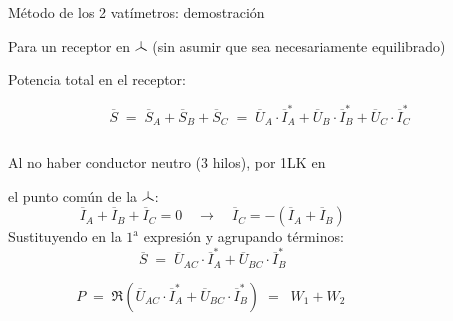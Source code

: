 \documentclass[aspectratio=169, usenames,svgnames,dvipsnames]{beamer}
\newcommand\wye{\scalerel*{\stackengine{-1pt}{%
  \rotatebox[origin=c]{30}{\rule{10pt}{.9pt}}\kern-1pt%
  \rotatebox[origin=c]{-30}{\rule{10pt}{1.3pt}}}{%
  \rule{.9pt}{10pt}}{O}{c}{F}{F}{S}}{\Delta}} %
\begin{document}
\begin{frame}{Método de los 2 vatímetros: \hspace{3mm}demostración}

    \vspace{2mm}
    Para un \alert{receptor} en $\wye$    
    \hspace{3mm}(sin asumir que sea necesariamente equilibrado)

    \vspace{2mm}
    \alert{Potencia total} en el receptor: 

    \vspace{-4mm}
    \begin{equation*}
	    \overline{S}
        \; = \; 
        \overline{S}_A + \overline{S}_B + \overline{S}_C
        \; = \; 
        \overline{U}_A \cdot \overline{I}_A^* + \overline{U}_B \cdot \overline{I}_B^* + \overline{U}_C \cdot \overline{I}_C^*
	\end{equation*}
 
	\begin{columns}
	\begin{column}{0.6\linewidth}
    
        Al no haber conductor neutro (\alert{3 hilos}), por \alert{1LK} en 
        
        el punto común de la $\wye$:
    	\begin{equation*}
    	    \overline{I}_A + \overline{I}_B + \overline{I}_C = 0 
            \quad \rightarrow \quad 
            \overline{I}_C = -(\overline{I}_A+\overline{I}_B)
    	\end{equation*}
    	Sustituyendo en la $1^{\textrm{a}}$ expresión y agrupando términos:
        \begin{equation*}
            \overline{S}
            \; = \;
            \overline{U}_{AC} \cdot \overline{I}_A^* + \overline{U}_{BC} \cdot \overline{I}_B^*
        \end{equation*} 

        \vspace{-2mm}
        \begin{equation*}
            P 
            \; = \;
            \Re(\overline{U}_{AC} \cdot \overline{I}_A^* + \overline{U}_{BC} \cdot \overline{I}_B^* )
            \; = \;
            \boxed{\; W_1 + W_2 \;}
        \end{equation*}  
	\end{column}
 
	\begin{column}{0.4\linewidth}


\end{column}
\end{columns}
\end{frame}
\end{document}
